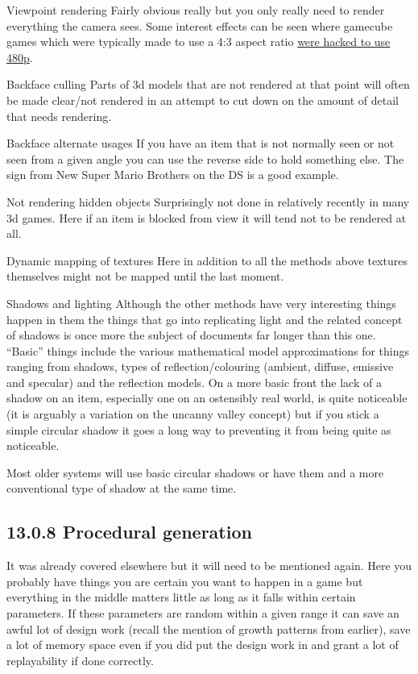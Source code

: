 \documentclass[
]{book}
\begin{document}
Viewpoint rendering Fairly obvious really but you only really need to render everything the camera sees. Some interest effects can be seen where gamecube games which were typically made to use a 4:3 aspect ratio \href{http://www.youtube.com/watch?\&v=qombIUAadOs}{were hacked to use 480p}.

Backface culling Parts of 3d models that are not rendered at that point will often be made clear/not rendered in an attempt to cut down on the amount of detail that needs rendering.

Backface alternate usages If you have an item that is not normally seen or not seen from a given angle you can use the reverse side to hold something else. The sign from New Super Mario Brothers on the DS is a good example.

Not rendering hidden objects Surprisingly not done in relatively recently in many 3d games. Here if an item is blocked from view it will tend not to be rendered at all.

Dynamic mapping of textures Here in addition to all the methods above textures themselves might not be mapped until the last moment.

Shadows and lighting Although the other methods have very interesting things happen in them the things that go into replicating light and the related concept of shadows is once more the subject of documents far longer than this one. ``Basic'' things include the various mathematical model approximations for things ranging from shadows, types of reflection/colouring (ambient, diffuse, emissive and specular) and the reflection models. On a more basic front the lack of a shadow on an item, especially one on an ostensibly real world, is quite noticeable (it is arguably a variation on the uncanny valley concept) but if you stick a simple circular shadow it goes a long way to preventing it from being quite as noticeable.

Most older systems will use basic circular shadows or have them and a more conventional type of shadow at the same time.

\hypertarget{procedural-generation}{%
\subsection{13.0.8 Procedural generation}\label{procedural-generation}}

It was already covered elsewhere but it will need to be mentioned again. Here you probably have things you are certain you want to happen in a game but everything in the middle matters little as long as it falls within certain parameters. If these parameters are random within a given range it can save an awful lot of design work (recall the mention of growth patterns from earlier), save a lot of memory space even if you did put the design work in and grant a lot of replayability if done correctly.
\end{document}
